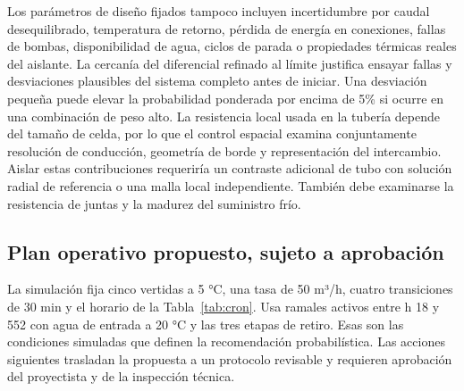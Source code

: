 \documentclass[11pt,a4paper]{article}
\begin{document}
Los parámetros de diseño fijados tampoco incluyen incertidumbre por caudal desequilibrado, temperatura de retorno, pérdida de energía en conexiones, fallas de bombas, disponibilidad de agua, ciclos de parada o propiedades térmicas reales del aislante. La cercanía del diferencial refinado al límite justifica ensayar fallas y desviaciones plausibles del sistema completo antes de iniciar. Una desviación pequeña puede elevar la probabilidad ponderada por encima de 5\% si ocurre en una combinación de peso alto. La resistencia local usada en la tubería depende del tamaño de celda, por lo que el control espacial examina conjuntamente resolución de conducción, geometría de borde y representación del intercambio. Aislar estas contribuciones requeriría un contraste adicional de tubo con solución radial de referencia o una malla local independiente. También debe examinarse la resistencia de juntas y la madurez del suministro frío.

\subsection*{Plan operativo propuesto, sujeto a aprobación}
La simulación fija cinco vertidas a 5 °C, una tasa de 50 m³/h, cuatro transiciones de 30 min y el horario de la Tabla~\ref{tab:cron}. Usa ramales activos entre h 18 y 552 con agua de entrada a 20 °C y las tres etapas de retiro. Esas son las condiciones simuladas que definen la recomendación probabilística. Las acciones siguientes trasladan la propuesta a un protocolo revisable y requieren aprobación del proyectista y de la inspección técnica.
\end{document}
